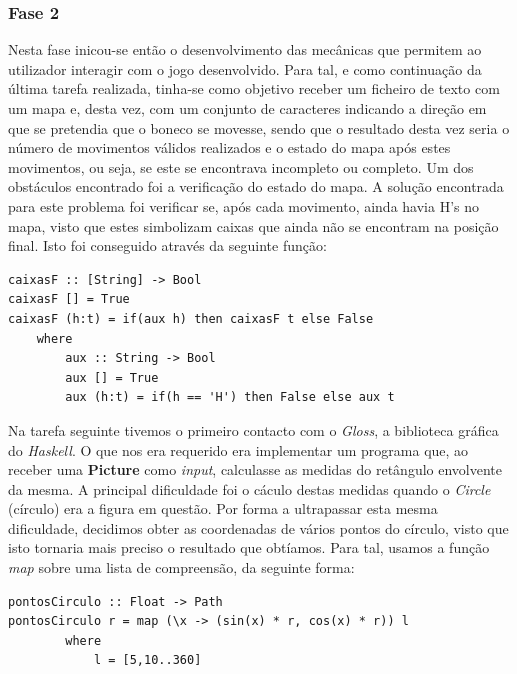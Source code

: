 \documentclass[a4paper]{article}
\begin{document}
\subsubsection{Fase 2}
Nesta fase inicou-se então o desenvolvimento das mecânicas que permitem ao utilizador interagir com o jogo desenvolvido.
Para tal, e como continuação da última tarefa realizada, tinha-se como objetivo receber um ficheiro de texto com um mapa e, desta vez, com um conjunto de caracteres indicando a direção em que se pretendia que o boneco se movesse, sendo que o resultado desta vez seria o número de movimentos válidos realizados e o estado do mapa após estes movimentos, ou seja, se este se encontrava incompleto ou completo. Um dos obstáculos encontrado foi a verificação do estado do mapa. A solução encontrada para este problema foi verificar se, após cada movimento, ainda havia H's no mapa, visto que estes simbolizam caixas que ainda não se encontram na posição final. Isto foi conseguido através da seguinte função:
\begin{verbatim}
caixasF :: [String] -> Bool
caixasF [] = True
caixasF (h:t) = if(aux h) then caixasF t else False
	where
		aux :: String -> Bool
		aux [] = True
		aux (h:t) = if(h == 'H') then False else aux t
\end{verbatim}

Na tarefa seguinte tivemos o primeiro contacto com o \emph{Gloss}, a biblioteca gráfica do \textit{Haskell}. O que nos era requerido era implementar um programa que, ao receber uma \textbf{Picture} como \textit{input}, calculasse as medidas do retângulo envolvente da mesma. A principal dificuldade foi o cáculo destas medidas quando o \emph{Circle} (círculo) era a figura em questão. Por forma a ultrapassar esta mesma dificuldade, decidimos obter as coordenadas de vários pontos do círculo, visto que isto tornaria mais preciso o resultado que obtíamos. Para tal, usamos a função \emph{map} sobre uma lista de compreensão, da seguinte forma:
\begin{verbatim}
pontosCirculo :: Float -> Path
pontosCirculo r = map (\x -> (sin(x) * r, cos(x) * r)) l
		where
			l = [5,10..360]
\end{verbatim}
\end{document}
